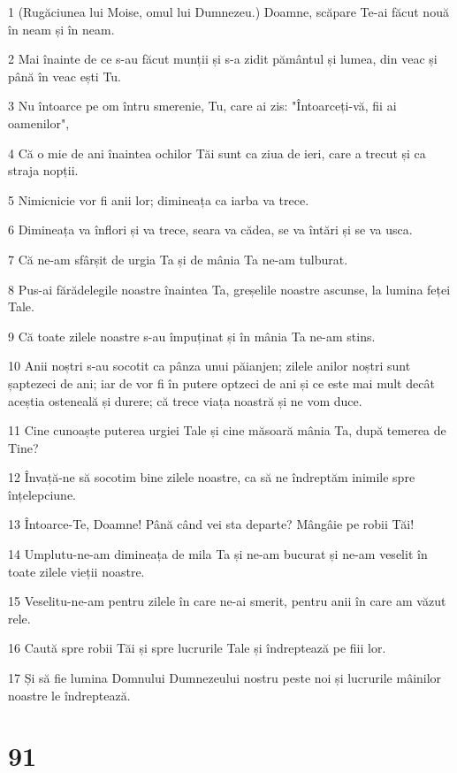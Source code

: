 \par 1 (Rugăciunea lui Moise, omul lui Dumnezeu.) Doamne, scăpare Te-ai făcut nouă în neam și în neam.
\par 2 Mai înainte de ce s-au făcut munții și s-a zidit pământul și lumea, din veac și până în veac ești Tu.
\par 3 Nu întoarce pe om întru smerenie, Tu, care ai zis: "Întoarceți-vă, fii ai oamenilor",
\par 4 Că o mie de ani înaintea ochilor Tăi sunt ca ziua de ieri, care a trecut și ca straja nopții.
\par 5 Nimicnicie vor fi anii lor; dimineața ca iarba va trece.
\par 6 Dimineața va înflori și va trece, seara va cădea, se va întări și se va usca.
\par 7 Că ne-am sfârșit de urgia Ta și de mânia Ta ne-am tulburat.
\par 8 Pus-ai fărădelegile noastre înaintea Ta, greșelile noastre ascunse, la lumina feței Tale.
\par 9 Că toate zilele noastre s-au împuținat și în mânia Ta ne-am stins.
\par 10 Anii noștri s-au socotit ca pânza unui păianjen; zilele anilor noștri sunt șaptezeci de ani; iar de vor fi în putere optzeci de ani și ce este mai mult decât aceștia osteneală și durere; că trece viața noastră și ne vom duce.
\par 11 Cine cunoaște puterea urgiei Tale și cine măsoară mânia Ta, după temerea de Tine?
\par 12 Învață-ne să socotim bine zilele noastre, ca să ne îndreptăm inimile spre înțelepciune.
\par 13 Întoarce-Te, Doamne! Până când vei sta departe? Mângâie pe robii Tăi!
\par 14 Umplutu-ne-am dimineața de mila Ta și ne-am bucurat și ne-am veselit în toate zilele vieții noastre.
\par 15 Veselitu-ne-am pentru zilele în care ne-ai smerit, pentru anii în care am văzut rele.
\par 16 Caută spre robii Tăi și spre lucrurile Tale și îndreptează pe fiii lor.
\par 17 Și să fie lumina Domnului Dumnezeului nostru peste noi și lucrurile mâinilor noastre le îndreptează.

\chapter{91}

